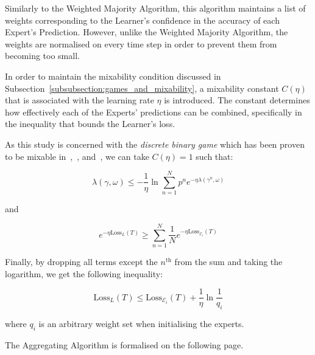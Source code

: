 Similarly to the Weighted Majority Algorithm, this algorithm maintains a list of weights corresponding to the Learner's confidence in the accuracy of each Expert’s Prediction. However, unlike the Weighted Majority Algorithm, the weights are normalised on every time step in order to prevent them from becoming too small.

In order to maintain the mixability condition discussed in Subsection~\ref{subsubsection:games_and_mixability}, a mixability constant $C(\eta)$ that is associated with the learning rate $\eta$ is introduced. The constant determines how effectively each of the Experts' predictions can be combined, specifically in the inequality that bounds the Learner's loss.

As this study is concerned with the \textit{discrete binary game} which has been proven to be mixable in~\cite{vovk:2001},~\cite{kalnishkan/vyugin:2008}, and~\cite{kalnishkan:2022}, we can take $C(\eta) = 1$ such that:

\begin{equation}
    \lambda(\gamma,\omega) \leq -\frac{1}{\eta}\ln\underset{n=1}{\overset{N}{\sum}}{p^n}e^{-\eta\lambda(\gamma^n, \omega)}
\end{equation}

and

\begin{equation}
    e^{-\eta\text{Loss}_L(T)} \geq \underset{n=1}{\overset{N}{\sum}}\frac{1}{N}e^{-\eta\text{Loss}_{\mathcal{E}_i}(T)}
\end{equation}

Finally, by dropping all terms except the $n^{\text{th}}$ from the sum and taking the logarithm, we get the following inequality:

\begin{equation}
    \text{Loss}_L(T) \leq \text{Loss}_{\mathcal{E}_i}(T) + \frac{1}{\eta}\ln\frac{1}{q_i}
\end{equation}

where $q_i$ is an arbitrary weight set when initialising the experts.

The Aggregating Algorithm is formalised on the following page.

